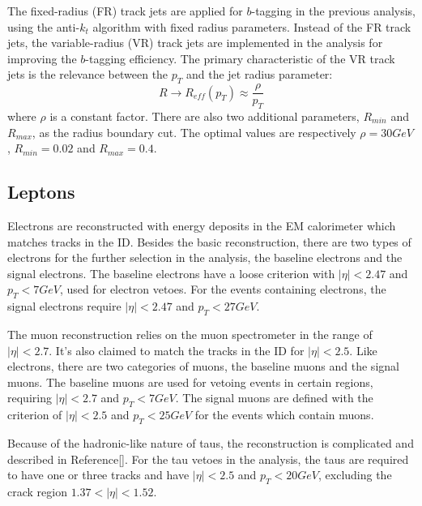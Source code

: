 \documentclass[class=NTHU_thesis, crop=false]{standalone}
\begin{document}
The fixed-radius (FR) track jets are applied for $b$-tagging in the previous analysis, using the anti-$k_t$ algorithm with fixed radius parameters. Instead of the FR track jets, the variable-radius (VR) track jets are implemented in the analysis for improving the $b$-tagging efficiency. The primary characteristic of the VR track jets is the relevance between the $p_T$ and the jet radius parameter: 
\begin{equation}
R \to R_{eff}(p_T) \approx \frac{\rho}{p_T}
\end{equation}
where $\rho$ is a constant factor. There are also two additional parameters, $R_{min}$ and $R_{max}$, as the radius boundary cut. The optimal values are respectively $\rho = 30 GeV$, $R_{min} = 0.02$ and $R_{max} = 0.4$.

\subsection{Leptons}
Electrons are reconstructed with energy deposits in the EM calorimeter which matches tracks in the ID. Besides the basic reconstruction, there are two types of electrons for the further selection in the analysis, the baseline electrons and the signal electrons. The baseline electrons have a loose criterion with $\left|\eta\right| < 2.47$ and $p_T < 7 GeV$, used for electron vetoes. For the events containing electrons, the signal electrons require $\left|\eta\right| < 2.47$ and $p_T < 27 GeV$.

The muon reconstruction relies on the muon spectrometer in the range of $\left|\eta\right| < 2.7$. It's also claimed to match the tracks in the ID for $\left|\eta\right| < 2.5$. Like electrons, there are two categories of muons, the baseline muons and the signal muons. The baseline muons are used for vetoing events in certain regions, requiring $\left|\eta\right| < 2.7$ and $p_T < 7 GeV$. The signal muons are defined with the criterion of $\left|\eta\right| < 2.5$ and $p_T < 25 GeV$ for the events which contain muons.

Because of the hadronic-like nature of taus, the reconstruction is complicated and described in Reference[]. For the tau vetoes in the analysis, the taus are required to have one or three tracks and have $\left|\eta\right| < 2.5$ and $p_T < 20 GeV$, excluding the crack region $1.37 < \left|\eta\right| < 1.52$.
\end{document}

